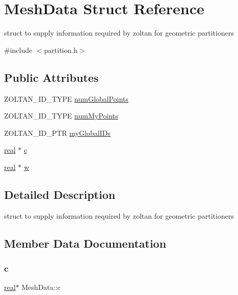 \hypertarget{structMeshData}{}\section{Mesh\+Data Struct Reference}
\label{structMeshData}


struct to supply information required by zoltan for geometric partitioners  




{\ttfamily \#include $<$partition.\+h$>$}

\subsection*{Public Attributes}
\begin{DoxyCompactItemize}
\item 
Z\+O\+L\+T\+A\+N\+\_\+\+I\+D\+\_\+\+T\+Y\+PE \mbox{\hyperlink{structMeshData_ad914c94084e0b65137af012fc9e917b4}{num\+Global\+Points}}
\item 
Z\+O\+L\+T\+A\+N\+\_\+\+I\+D\+\_\+\+T\+Y\+PE \mbox{\hyperlink{structMeshData_ae5e258a70cdd92582ef565bf1d874f98}{num\+My\+Points}}
\item 
Z\+O\+L\+T\+A\+N\+\_\+\+I\+D\+\_\+\+P\+TR \mbox{\hyperlink{structMeshData_a0120c5fdf85c35392a53e3b2cb7eb5e5}{my\+Global\+I\+Ds}}
\item 
\mbox{\hyperlink{definitions_8h_aedc0ad84d1e764530814f57ad931d02a}{real}} $\ast$ \mbox{\hyperlink{structMeshData_ae4c17a78f9a4f1ffcc50cf828120dd7b}{c}}
\item 
\mbox{\hyperlink{definitions_8h_aedc0ad84d1e764530814f57ad931d02a}{real}} $\ast$ \mbox{\hyperlink{structMeshData_a7c848439c3b116ccc9968b69f44da17f}{w}}
\end{DoxyCompactItemize}


\subsection{Detailed Description}
struct to supply information required by zoltan for geometric partitioners 

\subsection{Member Data Documentation}
\mbox{\label{structMeshData_ae4c17a78f9a4f1ffcc50cf828120dd7b}} 
\subsubsection{\texorpdfstring{c}{c}}
{\footnotesize\ttfamily \mbox{\hyperlink{definitions_8h_aedc0ad84d1e764530814f57ad931d02a}{real}}$\ast$ Mesh\+Data\+::c}

